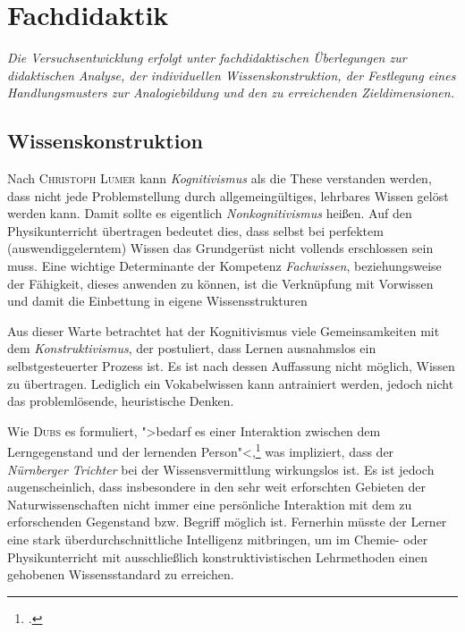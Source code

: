 \chapter{Fachdidaktik}
\label{kap:3}

\textit{Die Versuchsentwicklung erfolgt unter fachdidaktischen Überlegungen zur didaktischen Analyse,  der individuellen Wissenskonstruktion, der Festlegung eines Handlungsmusters zur Analogiebildung und den zu erreichenden Zieldimensionen.}

\section{Wissenskonstruktion}

Nach \textsc{Christoph Lumer} kann \textit{Kognitivismus} als die These verstanden werden, dass nicht jede Problemstellung durch allgemeingültiges, lehrbares Wissen gelöst werden kann. Damit sollte es eigentlich \textit{Nonkognitivismus} heißen. Auf den Physikunterricht übertragen bedeutet dies, dass selbst bei perfektem (auswendiggelerntem) Wissen das Grundgerüst nicht vollends erschlossen sein muss. Eine wichtige Determinante der Kompetenz \textit{Fachwissen}, beziehungsweise der Fähigkeit, dieses anwenden zu können, ist die Verknüpfung mit Vorwissen und damit die Einbettung in eigene Wissensstrukturen

Aus dieser Warte betrachtet hat der Kognitivismus viele Gemeinsamkeiten mit dem \textit{Konstruktivismus}, der postuliert, dass Lernen ausnahmslos ein selbstgesteuerter Prozess ist. Es ist nach dessen Auffassung nicht möglich, Wissen zu übertragen. Lediglich ein Vokabelwissen kann antrainiert werden, jedoch nicht das problemlösende, heuristische Denken.

Wie \textsc{Dubs} es formuliert, ">bedarf es einer Interaktion zwischen dem Lerngegenstand und der lernenden Person"<,\footcite[S.\,29]{Dubs2009} was impliziert, dass der \textit{Nürnberger Trichter} bei der Wissensvermittlung wirkungslos ist. Es ist jedoch augenscheinlich, dass insbesondere in den sehr weit erforschten Gebieten der Naturwissenschaften nicht immer eine persönliche Interaktion mit dem zu erforschenden Gegenstand bzw. Begriff möglich ist. Fernerhin müsste der Lerner eine stark überdurchschnittliche Intelligenz mitbringen, um im Chemie- oder Physikunterricht mit ausschließlich konstruktivistischen Lehrmethoden einen gehobenen Wissensstandard zu erreichen.

